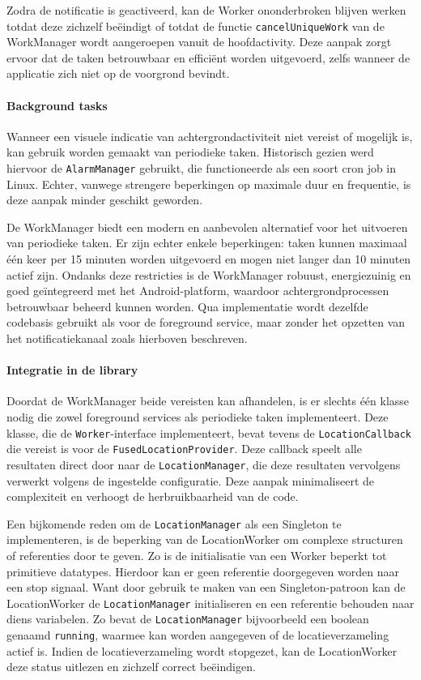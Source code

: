 Zodra de notificatie is geactiveerd, kan de Worker ononderbroken blijven werken totdat deze zichzelf beëindigt of totdat de functie \texttt{cancelUniqueWork} van de WorkManager wordt aangeroepen vanuit de hoofdactivity. Deze aanpak zorgt ervoor dat de taken betrouwbaar en efficiënt worden uitgevoerd, zelfs wanneer de applicatie zich niet op de voorgrond bevindt.

\paragraph{Background tasks}
Wanneer een visuele indicatie van achtergrondactiviteit niet vereist of mogelijk is, kan gebruik worden gemaakt van periodieke taken. Historisch gezien werd hiervoor de \texttt{AlarmManager} gebruikt, die functioneerde als een soort cron job in Linux. Echter, vanwege strengere beperkingen op maximale duur en frequentie, is deze aanpak minder geschikt geworden.

De WorkManager biedt een modern en aanbevolen alternatief voor het uitvoeren van periodieke taken. Er zijn echter enkele beperkingen: taken kunnen maximaal één keer per 15 minuten worden uitgevoerd en mogen niet langer dan 10 minuten actief zijn. Ondanks deze restricties is de WorkManager robuust, energiezuinig en goed geïntegreerd met het Android-platform, waardoor achtergrondprocessen betrouwbaar beheerd kunnen worden. Qua implementatie wordt dezelfde codebasis gebruikt als voor de foreground service, maar zonder het opzetten van het notificatiekanaal zoals hierboven beschreven.

\paragraph{Integratie in de library}
Doordat de WorkManager beide vereisten kan afhandelen, is er slechts één klasse nodig die zowel foreground services als periodieke taken implementeert. Deze klasse, die de \texttt{Worker}-interface implementeert, bevat tevens de \texttt{LocationCallback} die vereist is voor de \texttt{FusedLocationProvider}. Deze callback speelt alle resultaten direct door naar de \texttt{LocationManager}, die deze resultaten vervolgens verwerkt volgens de ingestelde configuratie. Deze aanpak minimaliseert de complexiteit en verhoogt de herbruikbaarheid van de code.

Een bijkomende reden om de \texttt{LocationManager} als een Singleton te implementeren, is de beperking van de LocationWorker om complexe structuren of referenties door te geven. Zo is de initialisatie van een Worker beperkt tot primitieve datatypes. Hierdoor kan er geen referentie doorgegeven worden naar een stop signaal. Want door gebruik te maken van een Singleton-patroon kan de LocationWorker de \texttt{LocationManager} initialiseren en een referentie behouden naar diens variabelen. Zo bevat de \texttt{LocationManager} bijvoorbeeld een boolean genaamd \texttt{running}, waarmee kan worden aangegeven of de locatieverzameling actief is. Indien de locatieverzameling wordt stopgezet, kan de LocationWorker deze status uitlezen en zichzelf correct beëindigen.
